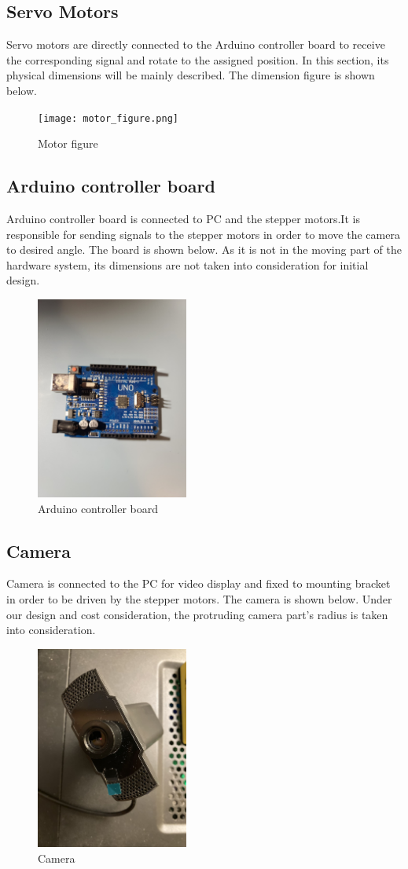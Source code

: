 \documentclass[12pt, titlepage]{article}
\begin{document}
\subsection{Servo Motors}
Servo motors are directly connected to the Arduino controller board to receive the corresponding signal and rotate to the assigned position. In this section, its physical dimensions will be mainly described. The dimension figure is shown below.
\begin{figure}[H]
\centering
\texttt{[image: motor\_figure.png]}
\caption{Motor figure}
\end{figure}


\subsection{Arduino controller board}
Arduino controller board is connected to PC and the stepper motors.It is responsible for sending signals to the stepper motors in order to move the camera to desired angle. The board is shown below. As it is not in the moving part of the hardware system, its dimensions are not taken into consideration for initial design.
\begin{figure}[H]
\centering
\includegraphics[width=5cm]{board}
\caption{Arduino controller board}
\end{figure}

\subsection{Camera}
Camera is connected to the PC for video display and fixed to mounting bracket in order to be driven by the stepper motors. The camera is shown below. Under our design and cost consideration, the protruding camera part's radius is taken into consideration.
\begin{figure}[H]
\centering
\includegraphics[width=5cm]{camera.jpg}
\caption{Camera}
\end{figure}
\end{document}
